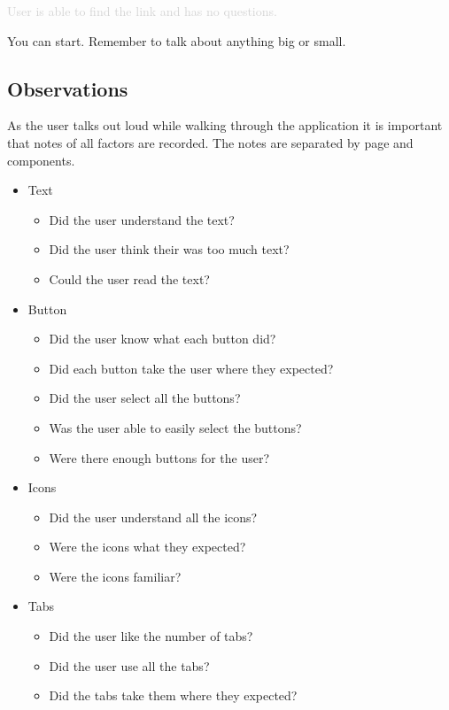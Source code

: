 \documentclass[a4 paper, 10pt]{article}
\begin{document}
    \textcolor{lightgray}
    {User is able to find the link and has no questions.}

    You can start. Remember to talk about anything big or small.

    \subsection*{Observations}
    As the user talks out loud while walking through the application it is important that notes of all factors are recorded. The notes are separated by page and components.

    \begin{multicols}{2}
        \begin{itemize}
            \item Text
                \begin{itemize}
                    \item Did the user understand the text?
                    \item Did the user think their was too much text?
                    \item Could the user read the text?
                \end{itemize}
            \item Button
                \begin{itemize}
                    \item Did the user know what each button did?
                    \item Did each button take the user where they expected?
                    \item Did the user select all the buttons?
                    \item Was the user able to easily select the buttons?
                    \item Were there enough buttons for the user?
                \end{itemize}
            \columnbreak
            \item Icons
                \begin{itemize}
                    \item Did the user understand all the icons?
                    \item Were the icons what they expected?
                    \item Were the icons familiar?
                \end{itemize} 
            \item Tabs
                \begin{itemize}
                    \item Did the user like the number of tabs?
                    \item Did the user use all the tabs?
                    \item Did the tabs take them where they expected?
                \end{itemize} 
        \end{itemize}
    \end{multicols}
\end{document}
